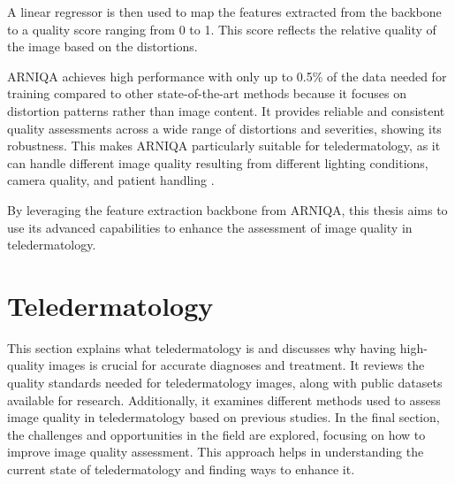 \vspace{\baselineskip}
\noindent
A linear regressor is then used to map the features extracted from the backbone to a quality score ranging from 0 to 1. This score reflects the relative quality of the image based on the distortions.\par
\vspace{\baselineskip}
\noindent
ARNIQA achieves high performance with only up to 0.5\% of the data needed for training compared to other state-of-the-art methods because it focuses on distortion patterns rather than image content. It provides reliable and consistent quality assessments across a wide range of distortions and severities, showing its robustness. This makes ARNIQA particularly suitable for teledermatology, as it can handle different image quality resulting from different lighting conditions, camera quality, and patient handling \autocite{ARNIQA}. \par
\vspace{\baselineskip}
\noindent
By leveraging the feature extraction backbone from ARNIQA, this thesis aims to use its advanced capabilities to enhance the assessment of image quality in teledermatology. \par

\section{Teledermatology}
\label{sec:Teledermatology}
This section explains what teledermatology is and discusses why having high-quality images is crucial for accurate diagnoses and treatment. It reviews the quality standards needed for teledermatology images, along with public datasets available for research. Additionally, it examines different methods used to assess image quality in teledermatology based on previous studies. In the final section, the challenges and opportunities in the field are explored, focusing on how to improve image quality assessment. This approach helps in understanding the current state of teledermatology and finding ways to enhance it. \par

